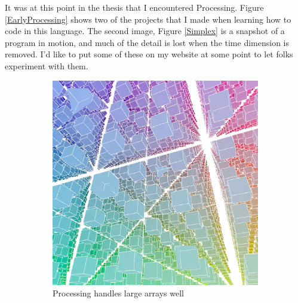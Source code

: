 \documentclass[12pt,twoside]{reedthesis}
\begin{document}
	It was at this point in the thesis that I encountered Processing. Figure \ref{EarlyProcessing} shows two of the projects that I made when learning how to code in this language. The second image, Figure \ref{Simplex} is a snapshot of a program in motion, and much of the detail is lost when the time dimension is removed. I'd like to put some of these on my website at some point to let folks experiment with them.\\
	
	\begin{figure}[H]
	\centering
	\begin{subfigure}{0.48\linewidth}
		\centering
		\includegraphics[width=\linewidth]{Images/ColorGrid}
		\caption{Processing handles large arrays well}
		\label{ColorGrid}
	\end{subfigure}%
	\hfill
	\begin{subfigure}{0.48\linewidth}
		\centering

\end{subfigure}
\end{figure}
\end{document}
